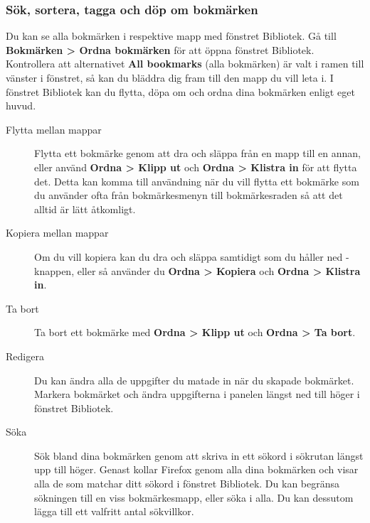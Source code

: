 \documentclass[a4paper,final]{memoir} %
\begin{document}

\xnegskip{}

\subsubsection{Sök, sortera, tagga och döp om bokmärken}

Du kan se alla bokmärken i respektive mapp med fönstret Bibliotek. Gå till \textbf{Bokmärken \textgreater{} Ordna bokmärken} för att öppna fönstret Bibliotek. Kontrollera att alternativet \textbf{All bookmarks} (alla bokmärken) är valt i ramen till vänster i fönstret, så kan du bläddra dig fram till den mapp du vill leta i. I fönstret Bibliotek kan du flytta, döpa om och ordna dina bokmärken enligt eget huvud. 


\begin{description}

\item[Flytta mellan mappar] Flytta ett bokmärke genom att dra och släppa från en mapp till en annan, eller använd \textbf{Ordna \textgreater{} Klipp ut} och \textbf{Ordna \textgreater{} Klistra in} för att flytta det. Detta kan komma till användning när du vill flytta ett bokmärke som du använder ofta från bokmärkesmenyn till bokmärkesraden så att det alltid är lätt åtkomligt. 

\item[Kopiera mellan mappar]Om du vill kopiera kan du dra och släppa samtidigt som du håller ned -knappen, eller så använder du \textbf{Ordna \textgreater{} Kopiera} och \textbf{Ordna \textgreater{} Klistra in}.

\item[Ta bort] Ta bort ett bokmärke med \textbf{Ordna \textgreater{} Klipp ut} och \textbf{Ordna \textgreater{} Ta bort}.

\item[Redigera] Du kan ändra alla de uppgifter du matade in när du skapade bokmärket. Markera bokmärket och ändra uppgifterna i panelen längst ned till höger i fönstret Bibliotek.

\item[Söka] Sök bland dina bokmärken genom att skriva in ett sökord i sökrutan längst upp till höger. Genast kollar Firefox genom alla dina bokmärken och visar alla de som matchar ditt sökord i fönstret Bibliotek. Du kan begränsa sökningen till en viss bokmärkesmapp, eller söka i alla. Du kan dessutom lägga till ett valfritt antal sökvillkor.

\end{description}
\end{document}
